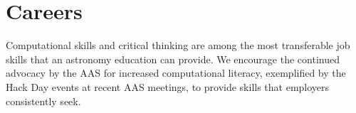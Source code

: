 \documentclass[11pt]{article}
\begin{document}
\section{Careers}

Computational skills and critical thinking are among the most
transferable job skills that an astronomy education can provide.
We encourage the continued advocacy by the AAS for increased
computational literacy, exemplified by the Hack Day events at recent AAS meetings, 
to provide skills that employers consistently seek.


\end{document}
